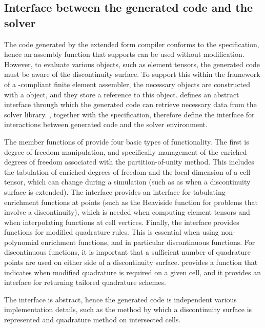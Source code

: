 \subsection{Interface between the generated code and the solver}

The code generated by the extended form compiler conforms to the \ufc{}
specification, hence an assembly function that supports \ufc{} can be
used without modification.  However, to evaluate various objects, such
as element tensors, the generated code must be aware of the discontinuity
surface.  To support this within the framework of a \ufc{}-compliant finite
element assembler, the necessary \ufc{} objects are constructed with
a  object, and they store a reference to this object.
 defines an abstract interface through which the generated
code can retrieve necessary data from the solver library. ,
together with the \ufc{} specification, therefore define the interface
for interactions between generated code and the solver environment.

The member functions of  provide four basic types
of functionality. The first is degree of freedom manipulation, and
specifically management of the enriched degrees of freedom associated
with the partition-of-unity method.  This includes the tabulation of
enriched degrees of freedom and the local dimension of a cell tensor,
which can change during a simulation (such as as when a discontinuity
surface is extended).  The  interface provides an
interface for tabulating enrichment functions at points (such as the
Heaviside function for problems that involve a discontinuity), which is
needed when computing element tensors and when interpolating functions at
cell vertices.  Finally, the  interface provides functions
for modified quadrature rules. This is essential when using non-polynomial
enrichment functions, and in particular discontinuous functions. For discontinuous
functions, it is important that a sufficient number of quadrature points
are used on either side of a discontinuity surface. 
provides a function that indicates when modified quadrature is required
on a given cell, and it provides an interface for returning tailored
quadrature schemes.

The  interface is abstract, hence the generated code
is independent various implementation details, such as the method by
which a discontinuity surface is represented and quadrature method on
intersected cells.

